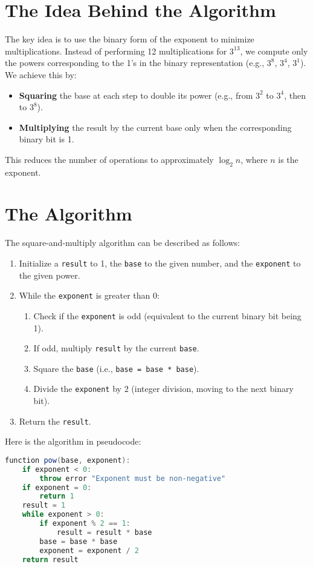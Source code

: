 \documentclass{article}
\begin{document}
    \section{The Idea Behind the Algorithm}
    The key idea is to use the binary form of the exponent to minimize multiplications. Instead of performing 12 multiplications for \(3^{13}\), we compute only the powers corresponding to the 1’s in the binary representation (e.g., \(3^8\), \(3^4\), \(3^1\)). We achieve this by:
    \begin{itemize}
        \item \textbf{Squaring} the base at each step to double its power (e.g., from \(3^2\) to \(3^4\), then to \(3^8\)).
        \item \textbf{Multiplying} the result by the current base only when the corresponding binary bit is 1.
    \end{itemize}
    This reduces the number of operations to approximately \(\log_2 n\), where \(n\) is the exponent.

    \section{The Algorithm}
    The square-and-multiply algorithm can be described as follows:
    \begin{enumerate}
        \item Initialize a \texttt{result} to 1, the \texttt{base} to the given number, and the \texttt{exponent} to the given power.
        \item While the \texttt{exponent} is greater than 0:
        \begin{enumerate}[label=(\alph*)]
            \item Check if the \texttt{exponent} is odd (equivalent to the current binary bit being 1).
            \item If odd, multiply \texttt{result} by the current \texttt{base}.
            \item Square the \texttt{base} (i.e., \texttt{base = base * base}).
            \item Divide the \texttt{exponent} by 2 (integer division, moving to the next binary bit).
        \end{enumerate}
        \item Return the \texttt{result}.
    \end{enumerate}

    Here is the algorithm in pseudocode:
    \begin{lstlisting}[language=Java]
function pow(base, exponent):
    if exponent < 0:
        throw error "Exponent must be non-negative"
    if exponent = 0:
        return 1
    result = 1
    while exponent > 0:
        if exponent % 2 == 1:
            result = result * base
        base = base * base
        exponent = exponent / 2
    return result
    \end{lstlisting}
\end{document}
